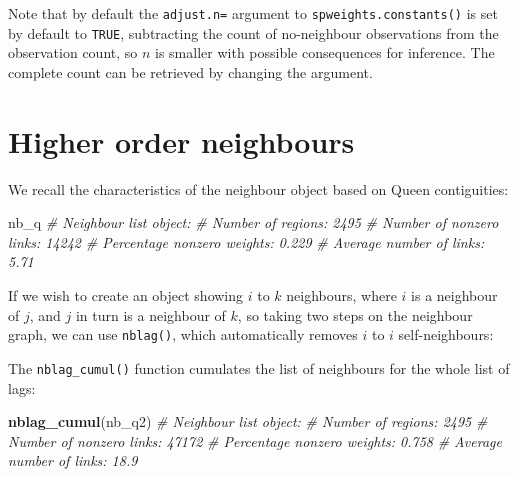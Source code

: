 \documentclass[]{book}
\newenvironment{Shaded}{\begin{snugshade}}{\end{snugshade}}
\newcommand{\CommentTok}[1]{\textcolor[rgb]{0.56,0.35,0.01}{\textit{#1}}}
\newcommand{\DecValTok}[1]{\textcolor[rgb]{0.00,0.00,0.81}{#1}}
\newcommand{\KeywordTok}[1]{\textcolor[rgb]{0.13,0.29,0.53}{\textbf{#1}}}
\newcommand{\NormalTok}[1]{#1}
\newcommand{\OperatorTok}[1]{\textcolor[rgb]{0.81,0.36,0.00}{\textbf{#1}}}
\newcommand{\StringTok}[1]{\textcolor[rgb]{0.31,0.60,0.02}{#1}}
\begin{document}
Note that by default the \texttt{adjust.n=} argument to \texttt{spweights.constants()} is set by default to \texttt{TRUE}, subtracting the count of no-neighbour observations from the observation count, so \(n\) is smaller with possible consequences for inference. The complete count can be retrieved by changing the argument.

\hypertarget{higher-order-neighbours}{%
\section{Higher order neighbours}\label{higher-order-neighbours}}

We recall the characteristics of the neighbour object based on Queen contiguities:

\begin{Shaded}
\begin{Highlighting}[]
\NormalTok{nb_q}
\CommentTok{# Neighbour list object:}
\CommentTok{# Number of regions: 2495 }
\CommentTok{# Number of nonzero links: 14242 }
\CommentTok{# Percentage nonzero weights: 0.229 }
\CommentTok{# Average number of links: 5.71}
\end{Highlighting}
\end{Shaded}

If we wish to create an object showing \(i\) to \(k\) neighbours, where \(i\) is a neighbour of \(j\), and \(j\) in turn is a neighbour of \(k\), so taking two steps on the neighbour graph, we can use \texttt{nblag()}, which automatically removes \(i\) to \(i\) self-neighbours:

\begin{Shaded}
\end{Shaded}

The \texttt{nblag\_cumul()} function cumulates the list of neighbours for the whole list of lags:

\begin{Shaded}
\begin{Highlighting}[]
\KeywordTok{nblag_cumul}\NormalTok{(nb_q2)}
\CommentTok{# Neighbour list object:}
\CommentTok{# Number of regions: 2495 }
\CommentTok{# Number of nonzero links: 47172 }
\CommentTok{# Percentage nonzero weights: 0.758 }
\CommentTok{# Average number of links: 18.9}
\end{Highlighting}
\end{Shaded}
\end{document}
